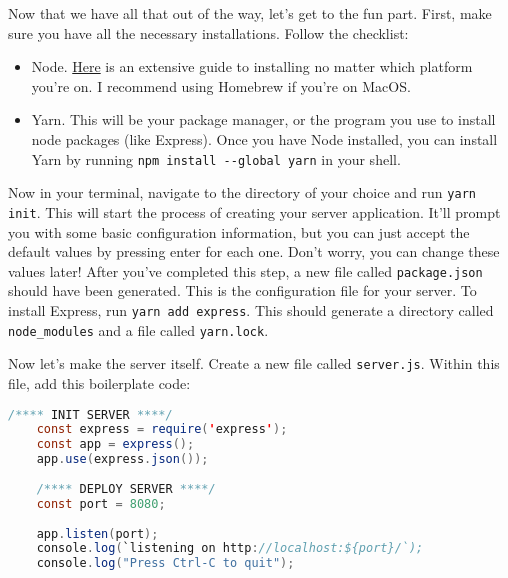 Now that we have all that out of the way, let's get to the fun part. First, make sure you have all the necessary installations. Follow the checklist:

\begin{itemize}
    \item Node. \href{https://nodejs.org/en/download/package-manager/#macos}{Here} is an extensive guide to installing no matter which platform you're on. I recommend using Homebrew if you're on MacOS.
    \item Yarn. This will be your package manager, or the program you use to install node packages (like Express). Once you have Node installed, you can install Yarn by running \texttt{npm install -{}-global yarn} in your shell. 
\end{itemize}

Now in your terminal, navigate to the directory of your choice and run \texttt{yarn init}. This will start the process of creating your server application. It'll prompt you with some basic configuration information, but you can just accept the default values by pressing enter for each one. Don't worry, you can change these values later! After you've completed this step, a new file called \texttt{package.json} should have been generated. This is the configuration file for your server. To install Express, run \texttt{yarn add express}. This should generate a directory called \texttt{node\_modules} and a file called \texttt{yarn.lock}.

Now let's make the server itself. Create a new file called \texttt{server.js}. Within this file, add this boilerplate code:

\begin{lstlisting}[language=Java]
    /**** INIT SERVER ****/
    const express = require('express');
    const app = express();
    app.use(express.json());
    
    /**** DEPLOY SERVER ****/
    const port = 8080;
    
    app.listen(port);
    console.log(`listening on http://localhost:${port}/`);
    console.log("Press Ctrl-C to quit");
\end{lstlisting}

